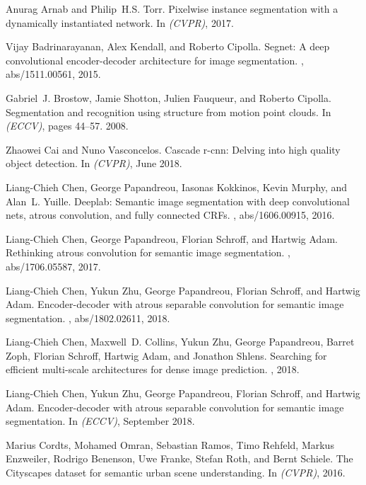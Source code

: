 \documentclass[10pt,twocolumn,letterpaper]{article}
\begin{document}
{\small
\begin{thebibliography}{10}\itemsep=-1pt

Anurag Arnab and Philip~H.S. Torr.
\newblock Pixelwise instance segmentation with a dynamically instantiated
  network.
\newblock In {\em (CVPR)}, 2017.

Vijay Badrinarayanan, Alex Kendall, and Roberto Cipolla.
\newblock Segnet: {A} deep convolutional encoder-decoder architecture for image
  segmentation.
, abs/1511.00561, 2015.

Gabriel~J. Brostow, Jamie Shotton, Julien Fauqueur, and Roberto Cipolla.
\newblock Segmentation and recognition using structure from motion point
  clouds.
\newblock In {\em (ECCV)}, pages 44--57. 2008.

Zhaowei Cai and Nuno Vasconcelos.
\newblock Cascade r-cnn: Delving into high quality object detection.
\newblock In {\em (CVPR)}, June 2018.

Liang{-}Chieh Chen, George Papandreou, Iasonas Kokkinos, Kevin Murphy, and
  Alan~L. Yuille.
\newblock Deeplab: Semantic image segmentation with deep convolutional nets,
  atrous convolution, and fully connected {CRF}s.
, abs/1606.00915, 2016.

Liang{-}Chieh Chen, George Papandreou, Florian Schroff, and Hartwig Adam.
\newblock Rethinking atrous convolution for semantic image segmentation.
, abs/1706.05587, 2017.

Liang{-}Chieh Chen, Yukun Zhu, George Papandreou, Florian Schroff, and Hartwig
  Adam.
\newblock Encoder-decoder with atrous separable convolution for semantic image
  segmentation.
, abs/1802.02611, 2018.

Liang-Chieh Chen, Maxwell~D. Collins, Yukun Zhu, George Papandreou, Barret
  Zoph, Florian Schroff, Hartwig Adam, and Jonathon Shlens.
\newblock Searching for efficient multi-scale architectures for dense image
  prediction.
, 2018.

Liang-Chieh Chen, Yukun Zhu, George Papandreou, Florian Schroff, and Hartwig
  Adam.
\newblock Encoder-decoder with atrous separable convolution for semantic image
  segmentation.
\newblock In {\em (ECCV)}, September 2018.

Marius Cordts, Mohamed Omran, Sebastian Ramos, Timo Rehfeld, Markus Enzweiler,
  Rodrigo Benenson, Uwe Franke, Stefan Roth, and Bernt Schiele.
\newblock The {C}ityscapes dataset for semantic urban scene understanding.
\newblock In {\em (CVPR)}, 2016.


\end{thebibliography}}
\end{document}
